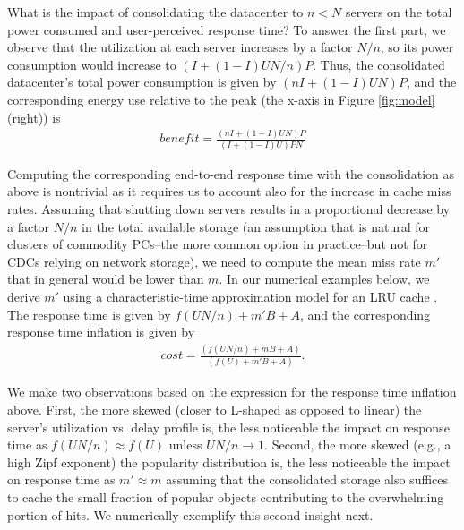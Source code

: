 What is the impact of consolidating the datacenter to $n<N$ servers on the total power consumed and user-perceived response time? To answer the first part, we observe that the utilization at each server increases by a factor $N/n$, so its power consumption would increase to $(I+(1-I)UN/n)P$. Thus, the consolidated datacenter's total power consumption is given by $(nI + (1-I)UN)P$, and the corresponding energy use relative to the peak (the x-axis in Figure  \ref{fig:model} (right)) is 
\begin{eqnarray}
\textit{benefit}  = \frac{ (nI + (1-I)UN)P}{(I+(1-I)U)PN}
\label{eq:benefit}
\end{eqnarray}

Computing the corresponding end-to-end response time with the consolidation as above is nontrivial as it requires us to account also for the increase in cache miss rates. Assuming that shutting down servers results in a proportional decrease by a factor $N/n$ in the total available storage (an assumption that is natural for clusters of commodity PCs--the more common option in practice--but not for CDCs relying on network storage), we need to compute the mean miss rate $m'$ that in general would be lower than $m$. In our numerical examples below, we derive $m'$ using a characteristic-time approximation model for an LRU cache \cite{che2002hierarchical}. 
The response time is given by $f(UN/n) + m'B + A$, and the corresponding response time 
inflation is given by 
\begin{eqnarray}
\textit{cost}  = \frac{ (f(UN/n) + mB + A)}{  (f(U) + m'B + A)}.
\label{eq:cost}
\end{eqnarray}

We make two observations based on the expression for the response time inflation above. First, the more skewed (closer to L-shaped as opposed to linear) the server's utilization vs. delay profile is, the less noticeable the impact on response time as $f(UN/n) \approx f(U)$ unless $UN/n \to 1$. Second, the more skewed (e.g., a high Zipf exponent) the popularity distribution is, the less noticeable the impact on response time as $m' \approx m$ assuming that the consolidated storage also suffices to cache the small fraction of popular objects contributing to the overwhelming portion of hits. We numerically exemplify this second insight next.
%

